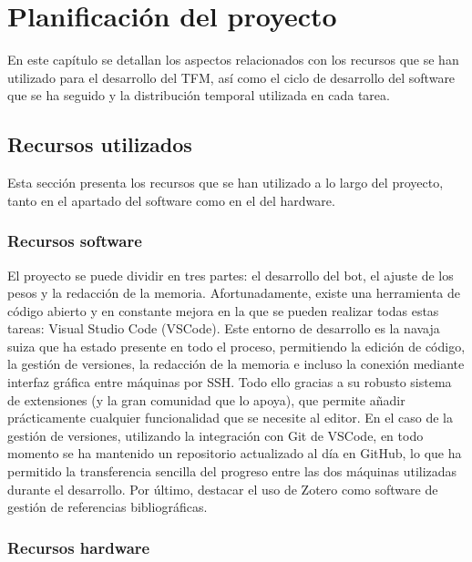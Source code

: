 \chapter{Planificación del proyecto} \label{chap:planificacion}

En este capítulo se detallan los aspectos relacionados con los recursos que se han utilizado para el desarrollo del TFM, así como el ciclo de desarrollo del software que se ha seguido y la distribución temporal utilizada en cada tarea.

\section{Recursos utilizados} \label{sec:recursos_utilizados}

Esta sección presenta los recursos que se han utilizado a lo largo del proyecto, tanto en el apartado del software como en el del hardware.

\subsection{Recursos software} \label{sec:recursos_software}

El proyecto se puede dividir en tres partes: el desarrollo del bot, el ajuste de los pesos y la redacción de la memoria. Afortunadamente, existe una herramienta de código abierto y en constante mejora en la que se pueden realizar todas estas tareas: Visual Studio Code (VSCode). Este entorno de desarrollo es la navaja suiza que ha estado presente en todo el proceso, permitiendo la edición de código, la gestión de versiones, la redacción de la memoria e incluso la conexión mediante interfaz gráfica entre máquinas por SSH. Todo ello gracias a su robusto sistema de extensiones (y la gran comunidad que lo apoya), que permite añadir prácticamente cualquier funcionalidad que se necesite al editor. En el caso de la gestión de versiones, utilizando la integración con Git de VSCode, en todo momento se ha mantenido un repositorio actualizado al día en GitHub, lo que ha permitido la transferencia sencilla del progreso entre las dos máquinas utilizadas durante el desarrollo. Por último, destacar el uso de Zotero como software de gestión de referencias bibliográficas.

\subsection{Recursos hardware} \label{sec:recursos_hardware}


